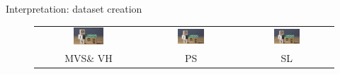\documentclass[10pt]{beamer}
\begin{document}
\begin{frame}{Interpretation: dataset creation}

\begin{figure}
\centering
\begin{tabular}{ccc}
\includegraphics[width=0.3\textwidth]{images/diy_repair_recon.jpg} &
\includegraphics[width=0.3\textwidth]{images/diy_repair_recon.jpg} &
\includegraphics[width=0.3\textwidth]{images/diy_repair_recon.jpg}\\
MVS\& VH & PS & SL \\
\end{tabular}
\end{figure}

\end{frame}


\end{document}
